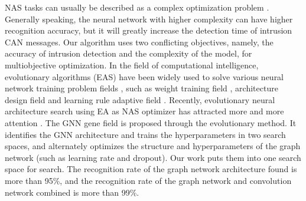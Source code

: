 \documentclass[lettersize,journal]{IEEEtran}
\begin{document}
NAS tasks can usually be described as a complex optimization problem \cite{29,31}. Generally speaking, the neural network with higher complexity can have higher recognition accuracy, but it will greatly increase the detection time of intrusion CAN messages. Our algorithm uses two conflicting objectives, namely, the accuracy of intrusion detection and the complexity of the model, for multiobjective optimization. In the field of computational intelligence, evolutionary algorithms (EAS) have been widely used to solve various neural network training problem fields \cite{32}, such as weight training field \cite{32}, architecture design field \cite{33} and learning rule adaptive field \cite{34}. Recently, evolutionary neural architecture search using EA as NAS optimizer has attracted more and more attention \cite{35,36,37}. The GNN gene field \cite{26} is proposed through the evolutionary method. It identifies the GNN architecture and trains the hyperparameters in two search spaces, and alternately optimizes the structure and hyperparameters of the graph network (such as learning rate and dropout). Our work puts them into one search space for search. The recognition rate of the graph network architecture found is more than 95\%, and the recognition rate of the graph network and convolution network combined is more than 99\%.
\end{document}
